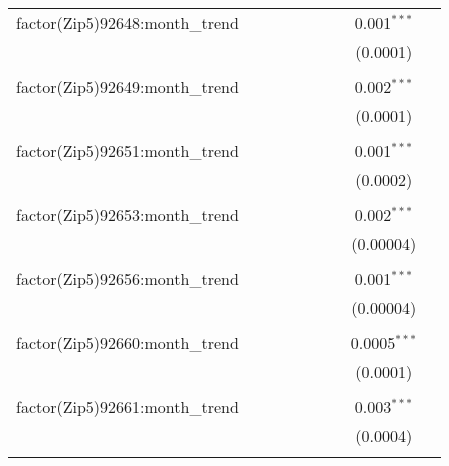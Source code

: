 \begin{table}[H]
{\begin{tabular}{@{\extracolsep{5pt}}lcccccccc}
  factor(Zip5)92648:month\_trend &  &  &  &  &  &  & 0.001$^{***}$ &  \\  

   &  &  &  &  &  &  & (0.0001) &  \\  

   & & & & & & & & \\  

  factor(Zip5)92649:month\_trend &  &  &  &  &  &  & 0.002$^{***}$ &  \\  

   &  &  &  &  &  &  & (0.0001) &  \\  

   & & & & & & & & \\  

  factor(Zip5)92651:month\_trend &  &  &  &  &  &  & 0.001$^{***}$ &  \\  

   &  &  &  &  &  &  & (0.0002) &  \\  

   & & & & & & & & \\  

  factor(Zip5)92653:month\_trend &  &  &  &  &  &  & 0.002$^{***}$ &  \\  

   &  &  &  &  &  &  & (0.00004) &  \\  

   & & & & & & & & \\  

  factor(Zip5)92656:month\_trend &  &  &  &  &  &  & 0.001$^{***}$ &  \\  

   &  &  &  &  &  &  & (0.00004) &  \\  

   & & & & & & & & \\  

  factor(Zip5)92660:month\_trend &  &  &  &  &  &  & 0.0005$^{***}$ &  \\  

   &  &  &  &  &  &  & (0.0001) &  \\  

   & & & & & & & & \\  

  factor(Zip5)92661:month\_trend &  &  &  &  &  &  & 0.003$^{***}$ &  \\  

   &  &  &  &  &  &  & (0.0004) &  \\  

   & & & & & & & & \\  


\end{tabular}}
\end{table}
